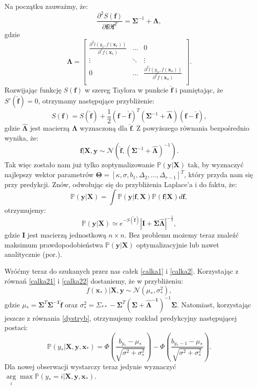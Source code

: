 \documentclass{mini}
\newcommand{\argmax}{\arg\!\max}
\begin{document}
Na początku zauważmy, że:
$$
\frac{\partial^2 S(\mathbf{f})}{\partial \mathbf{f}\partial \mathbf{f}^T} = 
\mathbf{\Sigma}^{-1}+\mathbf{\Lambda},
$$
gdzie
$$
\mathbf{\Lambda} = 
	\left[
        \begin{array}{ccc}
         \frac{\partial^2\textit{l}(y_1, f(\mathbf{x}_1))}{\partial^2 f(\mathbf{x}_1)} & \ldots & 0\\
         \vdots & \ddots & \vdots \\
         0 & \ldots & \frac{\partial^2\textit{l}(y_n, f(\mathbf{x}_n))}{\partial^2 f(\mathbf{x}_n)} \\
        \end{array}
    \right]. 
$$
Rozwijając funkcję $S(\mathbf{f})$ w szereg Taylora w punkcie $\mathbf{\hat{f}}$ i pamiętając, że $S'(\mathbf{\hat{f}})=0$, otrzymamy następujące przybliżenie:
$$
S(\mathbf{f}) = S(\mathbf{\hat{f}}) + \frac{1}{2}(\mathbf{f} - \mathbf{\hat{f}})^T(\mathbf{\Sigma}^{-1}+\hat{\mathbf{\Lambda}})(\mathbf{f}-\mathbf{\hat{f}}),
$$
gdzie $\hat{\mathbf{\Lambda}}$ jest macierzą $\mathbf{\Lambda}$ wyznaczoną dla $\mathbf{\hat{f}}$. Z powyższego równania bezpośrednio wynika, że:
\begin{equation}\label{calka22}
\mathbf{f} | \textbf{X}, \textbf{y} \sim \mathcal{N}\left(  \mathbf{\hat{f}}, (\mathbf{\Sigma}^{-1}+\hat{\mathbf{\Lambda}})^{-1}  \right).
\end{equation}
Tak więc zostało nam już tylko zoptymalizowanie $\mathbb{P}(\mathbf{y} | \textbf{X})$ tak, by wyznaczyć najlepszy wektor parametrów $\mathbf{\Theta} = [\kappa, \sigma, b_1, \Delta_2, \ldots, \Delta_{r-1}]^T$, który przyda nam się przy predykcji. Znów, odwołując się do przybliżenia Laplace'a i do faktu, że:
$$
\mathbb{P}(\mathbf{y} | \textbf{X}) = 
\int \mathbb{P}(\mathbf{y}|\mathbf{f}, \textbf{X})\mathbb{P}(\mathbf{f}|\textbf{X}) d\mathbf{f},
$$ 
otrzymujemy:
$$
\mathbb{P}(\mathbf{y} | \textbf{X}) \simeq e^{-S(\mathbf{\hat{f}})} \left\vert \mathbf{I} + \mathbf{\Sigma}\mathbf{\hat{\Lambda}} \right\vert^{-\frac{1}{2}},
$$
gdzie $\mathbf{I}$ jest macierzą jednostkową $n\times n$. Bez problemu możemy teraz znaleźć maksimum prawdopodobieństwa $\mathbb{P}(\mathbf{y} | \textbf{X})$ optymalizacyjnie lub nawet analitycznie (por.\cite{reg}).  

Wróćmy teraz do szukanych przez nas całek \eqref{calka1} i \eqref{calka2}. Korzystając z równań \eqref{calka21} i \eqref{calka22} dostaniemy, że w przybliżeniu:
$$
f(\mathbf{x}_{\ast}) | \textbf{X}, \textbf{y} \sim \mathcal{N}(\mu_{\ast}, \sigma_{\ast}^2),
$$
gdzie $\mu_{\ast} = \mathbf{\Sigma}^T \mathbf{\Sigma^{-1}} \mathbf{\hat{f}}$ oraz $\sigma_{\ast}^2 = \Sigma_{\ast\ast}-\mathbf{\Sigma}^T(\mathbf{\Sigma + \mathbf{\hat{\Lambda}}^{-1}})^{-1}\mathbf{\Sigma}$. Natomiast, korzystając jeszcze z równania \eqref{dystryb}, otrzymujemy rozkład predykcyjny następującej postaci:
$$
\mathbb{P}(y_{\ast} | \textbf{X}, \textbf{y}, \mathbf{x}_{\ast}) = 
\Phi\left(\frac{b_{y_{\ast}}-\mu_{\ast}}{\sqrt{\sigma^2+\sigma^2_{\ast}}} \right) 
- 
\Phi\left( \frac{b_{y_{\ast}-1}-\mu_{\ast}}{\sqrt{\sigma^2+\sigma^2_{\ast}}} \right).
$$
Dla nowej obserwacji wystarczy teraz jedynie wyznaczyć $\underset{i}\argmax \mathbb{P}(y_{\ast}=i | \textbf{X}, \textbf{y}, \mathbf{x}_{\ast})$.
\end{document}

